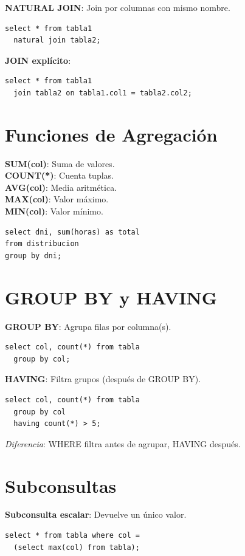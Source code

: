 \documentclass[10pt,a4paper,twocolumn]{article}
\begin{document}
\textbf{NATURAL JOIN}: Join por columnas con mismo nombre.
\begin{lstlisting}
select * from tabla1 
  natural join tabla2;
\end{lstlisting}

\textbf{JOIN explícito}:
\begin{lstlisting}
select * from tabla1 
  join tabla2 on tabla1.col1 = tabla2.col2;
\end{lstlisting}

\section{Funciones de Agregación}

\textbf{SUM(col)}: Suma de valores.\\
\textbf{COUNT(*)}: Cuenta tuplas.\\
\textbf{AVG(col)}: Media aritmética.\\
\textbf{MAX(col)}: Valor máximo.\\
\textbf{MIN(col)}: Valor mínimo.

\begin{lstlisting}
select dni, sum(horas) as total
from distribucion
group by dni;
\end{lstlisting}

\section{GROUP BY y HAVING}

\textbf{GROUP BY}: Agrupa filas por columna(s).
\begin{lstlisting}
select col, count(*) from tabla
  group by col;
\end{lstlisting}

\textbf{HAVING}: Filtra grupos (después de GROUP BY).
\begin{lstlisting}
select col, count(*) from tabla
  group by col
  having count(*) > 5;
\end{lstlisting}

\textit{Diferencia}: WHERE filtra antes de agrupar, HAVING después.

\section{Subconsultas}

\textbf{Subconsulta escalar}: Devuelve un único valor.
\begin{lstlisting}
select * from tabla where col =
  (select max(col) from tabla);
\end{lstlisting}
\end{document}
